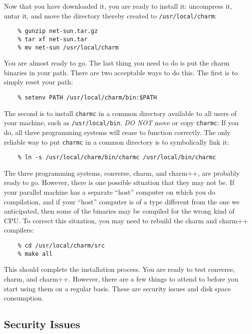 Now that you have downloaded it, you are ready to install it: uncompress it,
untar it, and move the directory thereby created to {\tt /usr/local/charm}:

\begin{verbatim}
    % gunzip net-sun.tar.gz
    % tar xf net-sun.tar
    % mv net-sun /usr/local/charm
\end{verbatim}

You are almost ready to go.  The last thing you need to do is put the
charm binaries in your path.  There are two acceptable ways to do
this.  The first is to simply reset your path:

\begin{verbatim}
    % setenv PATH /usr/local/charm/bin:$PATH
\end{verbatim}

The second is to install {\tt charmc} in a common directory available
to all users of your machine, such as {\tt /usr/local/bin}.  {\em DO
NOT} move or copy {\tt charmc}: If you do, all three programming
systems will cease to function correctly.  The only reliable way to
put {\tt charmc} in a common directory is to symbolically link it:

\begin{verbatim}
    % ln -s /usr/local/charm/bin/charmc /usr/local/bin/charmc
\end{verbatim}

The three programming systems, converse, charm, and charm++, are
probably ready to go.  However, there is one possible situation that
they may not be.  If your parallel machine has a separate ``host''
computer on which you do compilation, and if your ``host'' computer is
of a type different from the one we anticipated, then some of the
binaries may be compiled for the wrong kind of CPU.  To correct this
situation, you may need to rebuild the charm and charm++ compilers:

\begin{verbatim}
    % cd /usr/local/charm/src
    % make all
\end{verbatim}

This should complete the installation process.  You are ready to test
converse, charm, and charm++.  However, there are a few things to
attend to before you start using them on a regular basis.  These are
security issues and disk space consumption.

\subsection{Security Issues}

